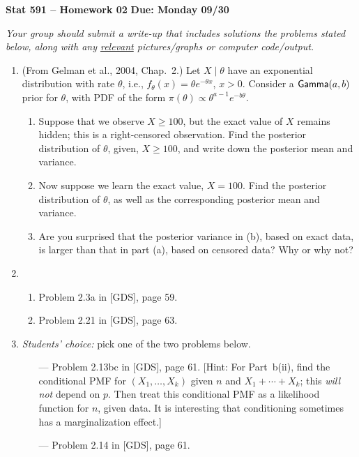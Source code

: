 \documentclass[a4paper,12pt]{article}
\begin{document}
\noindent \large \textbf{Stat 591 -- Homework 02} \hfill \textbf{Due: Monday 09/30} \normalsize

\medskip

\noindent \emph{Your group should submit a write-up that includes solutions the problems stated below, along with any \underline{relevant} pictures/graphs or computer code/output.}  

\medskip

\begin{enumerate}

\item (From Gelman et al., 2004, Chap.~2.) Let $X \mid \theta$ have an exponential distribution with rate $\theta$, i.e., $f_\theta(x) = \theta e^{-\theta x}$, $x > 0$.  Consider a ${\sf Gamma}(a,b)$ prior for $\theta$, with PDF of the form $\pi(\theta) \propto \theta^{a-1} e^{-b\theta}$.    
\begin{enumerate}
\item Suppose that we observe $X \geq 100$, but the exact value of $X$ remains hidden; this is a right-censored observation.  Find the posterior distribution of $\theta$, given, $X \geq 100$, and write down the posterior mean and variance.  
\item Now suppose we learn the exact value, $X=100$.  Find the posterior distribution of $\theta$, as well as the corresponding posterior mean and variance.  
\item Are you surprised that the posterior variance in (b), based on exact data, is larger than that in part (a), based on censored data?  Why or why not? 
\end{enumerate}

\item 
\begin{enumerate}
\item Problem 2.3a in [GDS], page 59.
\item Problem 2.21 in [GDS], page 63. 
\end{enumerate}




\item \emph{Students' choice:} pick one of the two problems below.
\begin{itemize}
\item[---] Problem 2.13bc in [GDS], page 61. [Hint: For Part~b(ii), find the conditional PMF for $(X_1,\ldots,X_k)$ given $n$ and $X_1+\cdots+X_k$; this \emph{will not} depend on $p$.  Then treat this conditional PMF as a likelihood function for $n$, given data.  It is interesting that conditioning sometimes has a marginalization effect.]
\item[---] Problem 2.14 in [GDS], page 61.
\end{itemize}


\end{enumerate}
\end{document}
